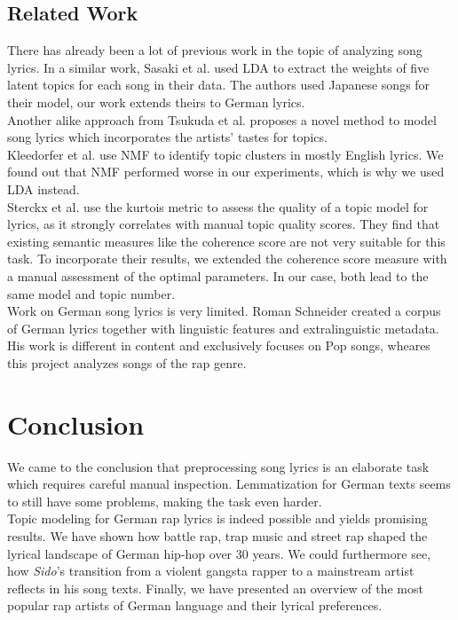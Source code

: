 \documentclass[conference]{IEEEtran}
\begin{document}
\subsection{Related Work}
There has already been a lot of previous work in the topic of analyzing song lyrics. In a similar work, Sasaki et al. \cite{sasaki} used LDA to extract the weights of five latent topics for each song in their data. The authors used Japanese songs for their model, our work extends theirs to German lyrics.\\
Another alike approach from Tsukuda et al. \cite{tsukuda} proposes a novel method to model song lyrics which incorporates the artists' tastes for topics.\\
Kleedorfer et al. \cite{kleedorfer} use NMF to identify topic clusters in mostly English lyrics. We found out that NMF performed worse in our experiments, which is why we used LDA instead.\\
Sterckx et al. \cite{sterckx} use the kurtois metric to assess the quality of a topic model for lyrics, as it strongly correlates with manual topic quality scores. They find that existing semantic measures like the coherence score are not very suitable for this task. To incorporate their results, we extended the coherence score measure with a manual assessment of the optimal parameters. In our case, both lead to the same model and topic number.\\
Work on German song lyrics is very limited. Roman Schneider \cite{schneider} created a corpus of German lyrics together with linguistic features and extralinguistic metadata. His work is different in content and exclusively focuses on Pop songs, wheares this project analyzes songs of the rap genre.

\section{Conclusion}
We came to the conclusion that preprocessing song lyrics is an elaborate task which requires careful manual inspection. Lemmatization for German texts seems to still have some problems, making the task even harder.\\
Topic modeling for German rap lyrics is indeed possible and yields promising results. We have shown how battle rap, trap music and street rap shaped the lyrical landscape of German hip-hop over 30 years. We could furthermore see, how \textit{Sido}'s transition from a violent gangsta rapper to a mainstream artist reflects in his song texts. Finally, we have presented an overview of the most popular rap artists of German language and their lyrical preferences.

{
\balance{
  
  
  }
}
\end{document}

